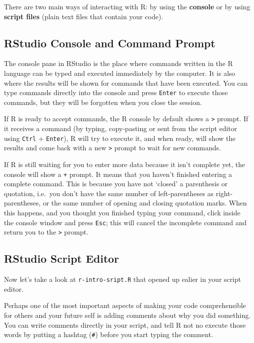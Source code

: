 \documentclass[
]{book}
\begin{document}
There are two main ways of interacting with R: by using the \textbf{console} or by using
\textbf{script files} (plain text files that contain your code).

\subsection{RStudio Console and Command Prompt}\label{rstudio-console-and-command-prompt}

The console pane in RStudio is the place where commands written in the R
language can be typed and executed immediately by the computer. It is also where
the results will be shown for commands that have been executed. You can type
commands directly into the console and press \texttt{Enter} to execute those commands, but they will be forgotten when you close the session.

If R is ready to accept commands, the R console by default shows a \texttt{\textgreater{}} prompt. If it
receives a command (by typing, copy-pasting or sent from the script editor using
\texttt{Ctrl} + \texttt{Enter}), R will try to execute it, and when
ready, will show the results and come back with a new \texttt{\textgreater{}} prompt to wait for new
commands.

If R is still waiting for you to enter more data because it isn't complete yet,
the console will show a \texttt{+} prompt. It means that you haven't finished entering
a complete command. This is because you have not `closed' a parenthesis or
quotation, i.e.~you don't have the same number of left-parentheses as
right-parentheses, or the same number of opening and closing quotation marks.
When this happens, and you thought you finished typing your command, click
inside the console window and press \texttt{Esc}; this will cancel the incomplete
command and return you to the \texttt{\textgreater{}} prompt.

\subsection{RStudio Script Editor}\label{rstudio-script-editor}

Now let's take a look at \texttt{r-intro-sript.R} that opened up ealier in your script editor.

Perhaps one of the most important aspects of making your code comprehensible for others and your future self is adding comments about why you did something. You can write comments directly in your script, and tell R not no execute those words by putting a hashtag (\texttt{\#}) before you start typing the comment.
\end{document}
